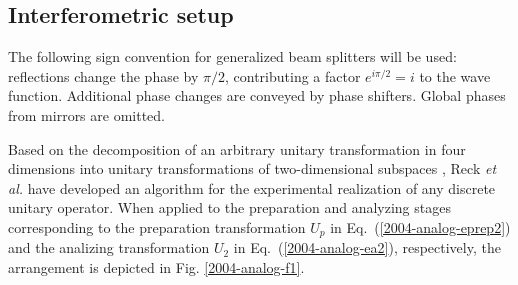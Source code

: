 \documentclass[pra,preprint,showpacs,showkeys,amsfonts]{revtex4}
\begin{document}
\subsection{Interferometric setup}

The following sign convention for generalized beam splitters will be used:
reflections  change the phase by $\pi /2$, contributing a factor $e^{i\pi /2}=i$
to the wave function.
Additional phase changes are conveyed by phase shifters.
Global phases from mirrors are omitted.

Based on the decomposition of an arbitrary unitary
transformation in four dimensions into unitary transformations
of two-dimensional subspaces \cite{murnaghan}, Reck {\it et al.}  \cite{rzbb}
have developed an algorithm \cite{reck-96} for the experimental realization
of any discrete unitary operator.
When applied to the preparation and analyzing stages corresponding to
the preparation transformation $U_p$ in Eq.~(\ref{2004-analog-eprep2})
and the analizing transformation $U_2$ in Eq.~(\ref{2004-analog-ea2}),
respectively,
the arrangement is depicted in Fig. \ref{2004-analog-f1}.
\end{document}
